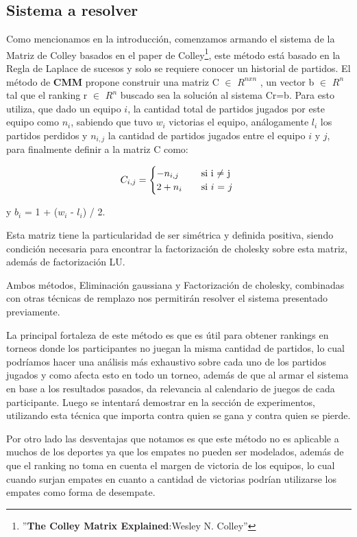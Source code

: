 \subsection{Sistema a resolver}

Como mencionamos en la introducción, comenzamos armando el sistema de la Matriz de Colley basados en el paper de Colley\footnote{''\textbf{The Colley Matrix Explained}:Wesley N. Colley''}, este método está basado en la Regla de Laplace de sucesos y solo se requiere conocer un historial de partidos. 
El método de \textbf{CMM} propone construir una matriz C $\in$ $ R^{nxn}$ , un vector b $\in$ $ R^n$ tal que el ranking r $\in$ $R^n$ buscado sea la solución al sistema Cr=b.
Para esto utiliza, que dado un equipo $i$, la cantidad total de partidos jugados por este equipo como $n_i$, sabiendo que tuvo $w_i$ victorias el equipo, análogamente $l_i$ los partidos perdidos y $n_{i,j}$ la cantidad de partidos jugados entre el equipo $i$ y $j$, para finalmente definir a la matriz C como: 

\[ C_{i,j} =
    \begin{cases}
        -n_{i,j}       & \quad \text{si }  \text{i $\neq$ j}\\
        2+n_i & \quad \text{si } \text{$i$ $=$ $j$ }\\
    \end{cases}
$$
  $$  \]
                    
y $b_i$ = 1 +  ($w_i$ - $l_i$) / 2.

Esta matriz tiene la particularidad de ser simétrica y definida positiva, siendo condición necesaria para encontrar la factorización de cholesky sobre esta matriz, además de factorización LU.

Ambos métodos, Eliminación gaussiana y Factorización de cholesky, combinadas con otras técnicas de remplazo nos permitirán resolver el sistema presentado previamente.

La principal fortaleza de este método es que es útil para obtener rankings en torneos donde los participantes no juegan la misma cantidad de partidos, lo cual 
podríamos hacer una análisis más exhaustivo sobre cada uno de los partidos jugados y como afecta esto en todo un torneo,
además de que al armar el sistema en base a los resultados pasados, da relevancia al calendario de juegos de cada participante. 
Luego se intentará demostrar en la sección de experimentos, utilizando esta técnica que importa contra quien se gana y contra quien se pierde.

Por otro lado las desventajas que notamos es que este método no es aplicable a muchos de los deportes ya que los empates no pueden ser modelados, además de que el ranking no toma en cuenta
el margen de victoria de los equipos, lo cual cuando surjan empates en cuanto a cantidad de victorias podrían utilizarse los empates como forma de desempate.

